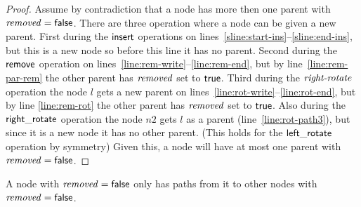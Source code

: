 \begin{proof}
Assume by contradiction that a node has more then one parent with $\ms{removed} = \lit{false}$.
There are three operation where a node can be given a new parent.
First during the $\act{insert}$ operations on lines~\ref{sline:start-ins}--\ref{sline:end-ins}, but this is a new node so before this line it has no parent.
Second during the $\act{remove}$ operation on lines~\ref{line:rem-write}--\ref{line:rem-end}, but by line~\ref{line:rem-par-rem} the other parent has $\ms{removed}$ set to $\lit{true}$.
Third during the $\ms{right-rotate}$ operation the node $l$ gets a new parent on lines~\ref{line:rot-write}--\ref{line:rot-end}, but by line \ref{line:rem-rot} the other parent has $\ms{removed}$ set to $\lit{true}$.
Also during the $\act{right\_rotate}$ operation the node $n2$ gets $l$ as a parent (line~\ref{line:rot-path3}), but since it is a new node it has no other parent.
(This holds for the $\act{left\_rotate}$ operation by symmetry)
Given this, a node will have at most one parent with $\ms{removed}=\lit{false}$.
\end{proof}

\begin{lemma}
\label{lemma:false-rem}
A node with $\ms{removed}=\lit{false}$ only has paths from it to other nodes with $\ms{removed}=\lit{false}$.
\end{lemma}

